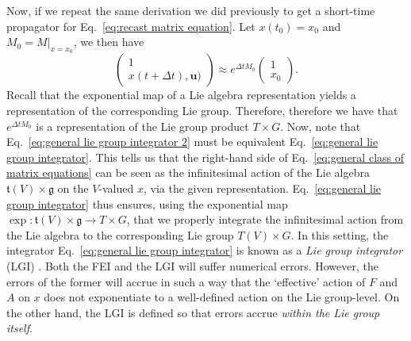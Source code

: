  Now, if we repeat the same derivation we did previously to get a short-time propagator for Eq.~\ref{eq:recast matrix equation}. Let $x(t_0) = x_0$ and $M_0 = M|_{x = x_0}$, we then have
\begin{equation} \label{eq:general lie group integrator 2}
	\begin{pmatrix}
		1 \\ x(t + \Delta t), \mathbf{u})
	\end{pmatrix} \approx e^{\Delta t M_0} \begin{pmatrix}
		1 \\ x_0
	\end{pmatrix}.
\end{equation}
Recall that the exponential map of a Lie algebra representation yields a representation of the corresponding Lie group. Therefore, therefore we have that $e^{\Delta t M_0}$ is a representation of the Lie group product $T \times G$. Now, note that Eq.~\ref{eq:general lie group integrator 2} must be equivalent Eq.~\ref{eq:general lie group integrator}. This tells us that the right-hand side of Eq.~\ref{eq:general class of matrix equations} can be seen as the infinitesimal action of the Lie algebra $\mathfrak{t}(V) \times \mathfrak{g}$ on the $V$-valued $x$, via the given representation. Eq.~\ref{eq:general lie group integrator} thus ensures, using the exponential map $\exp : \mathfrak{t}(V) \times \mathfrak{g} \to T \times G$, that we properly integrate the infinitesimal action from the Lie algebra to the corresponding Lie group $T(V) \times G$. In this setting, the integrator Eq.~\ref{eq:general lie group integrator} is known as a \textit{Lie group integrator} (LGI) \citep{celledoniIntroductionLieGroup2014c, owrenLieGroupIntegrators2016, iserlesLiegroupMethods2005, celledoniLieGroupIntegrators2022}. Both the FEI and the LGI will suffer numerical errors. However, the errors of the former will accrue in such a way that the `effective' action of $F$ and $A$ on $x$ does not exponentiate to a well-defined action on the Lie group-level. On the other hand, the LGI is defined so that errors accrue \textit{within the Lie group itself}.



